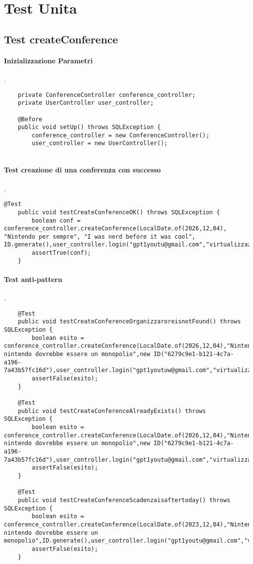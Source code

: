\section{Test Unita}
\label{sec:test_unita}

\subsection{Test createConference}
\paragraph{Inizializzazione Parametri}
.
\begin{lstlisting}
    private ConferenceController conference_controller;
    private UserController user_controller;

    @Before
    public void setUp() throws SQLException {
        conference_controller = new ConferenceController();
        user_controller = new UserController();
    
\end{lstlisting}
\paragraph{Test creazione di una conferenza con successo}
.
\begin{lstlisting}
@Test
    public void testCreateConferenceOK() throws SQLException {
        boolean conf = conference_controller.createConference(LocalDate.of(2026,12,04), "Nintendo per sempre", "I was nerd before it was cool", ID.generate(),user_controller.login("gpt1youtu@gmail.com","virtualizzazione"));
        assertTrue(conf);
    }
\end{lstlisting}
\paragraph{Test anti-pattern }
.
\begin{lstlisting}
    @Test
    public void testCreateConferenceOrganizzaroreisnotFound() throws SQLException {
        boolean esito = conference_controller.createConference(LocalDate.of(2026,12,04),"Nintendo","Perche nintendo dovrebbe essere un monopolio",new ID("6279c9e1-b121-4c7a-a196-7a43b57fc16d"),user_controller.login("gpt1youtuw@gmail.com","virtualizzazione"));
        assertFalse(esito);
    }

    @Test
    public void testCreateConferenceAlreadyExists() throws SQLException {
        boolean esito = conference_controller.createConference(LocalDate.of(2026,12,04),"Nintendo","Perche nintendo dovrebbe essere un monopolio",new ID("6279c9e1-b121-4c7a-a196-7a43b57fc16d"),user_controller.login("gpt1youtu@gmail.com","virtualizzazione"));
        assertFalse(esito);
    }

    @Test
    public void testCreateConferenceScadenzaisaftertoday() throws SQLException {
        boolean esito = conference_controller.createConference(LocalDate.of(2023,12,04),"Nintendo","Perche nintendo dovrebbe essere un monopolio",ID.generate(),user_controller.login("gpt1youtu@gmail.com","virtualizzazione"));
        assertFalse(esito);
    }
\end{lstlisting}

